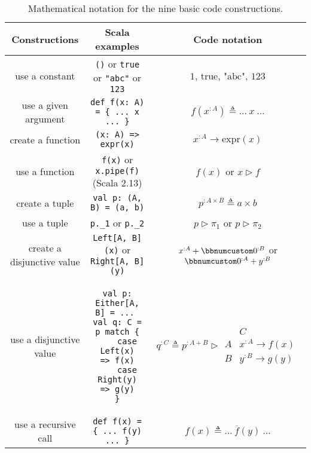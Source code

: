 \begin{table}
\begin{centering}
\begin{tabular}{|c|c|c|}
\hline 
\textbf{\small{}Constructions} & \textbf{\small{}Scala examples} & \textbf{\small{}Code notation}\tabularnewline
\hline 
\hline 
{\small{}use a constant} & {\small{}}\lstinline!()!{\small{} or }\lstinline!true!{\small{}
or }\lstinline!"abc"!{\small{} or }\lstinline!123! & {\small{}$1$, $\text{true}$, $\text{"abc"}$, $123$}\tabularnewline
\hline 
{\small{}use a given argument} & {\small{}}\lstinline!def f(x: A) = { ... x ... }! & {\small{}$f(x^{:A})\triangleq...~x~...$}\tabularnewline
\hline 
{\small{}create a function} & {\small{}}\lstinline!(x: A) => expr(x)! & {\small{}$x^{:A}\rightarrow\text{expr}\left(x\right)$}\tabularnewline
\hline 
{\small{}use a function} & {\small{}}\lstinline!f(x)!{\small{} or }\lstinline!x.pipe(f)!{\small{}
(Scala 2.13)} & {\small{}$f(x)$ or $x\triangleright f$}\tabularnewline
\hline 
{\small{}create a tuple} & {\small{}}\lstinline!val p: (A, B) = (a, b)! & {\small{}$p^{:A\times B}\triangleq a\times b$}\tabularnewline
\hline 
{\small{}use a tuple} & {\small{}}\lstinline!p._1!{\small{} or }\lstinline!p._2! & {\small{}$p\triangleright\pi_{1}$ or $p\triangleright\pi_{2}$}\tabularnewline
\hline 
{\small{}create a disjunctive value} & {\small{}}\lstinline!Left[A, B](x)!{\small{} or }\lstinline!Right[A, B](y)! & {\small{}$x^{:A}+\bbnum 0^{:B}$ or $\bbnum 0^{:A}+y^{:B}$}\tabularnewline
\hline 
{\small{}use a disjunctive value} & {\small{}\hspace*{-0.013\linewidth}}%
\begin{minipage}[c][1\totalheight][b]{0.33\columnwidth}%
{\small{}\vspace{0.14\baselineskip}
}
\begin{lstlisting}
val p: Either[A, B] = ... 
val q: C = p match {
    case Left(x)   => f(x)
    case Right(y)  => g(y)
}
\end{lstlisting}
{\small{}\vspace{-0.1\baselineskip}
}%
\end{minipage}{\small{} \hspace*{-0.009\linewidth}} & {\small{}$q^{:C}\triangleq p^{:A+B}\triangleright\begin{array}{|c||c|}
 & C\\
\hline A & x^{:A}\rightarrow f(x)\\
B & y^{:B}\rightarrow g(y)
\end{array}$}\tabularnewline
\hline 
{\small{}use a recursive call} & {\small{}}\lstinline!def f(x) = { ... f(y) ... }! & {\small{}$f(x)\triangleq...~\overline{f}(y)~...$}\tabularnewline
\hline 
\end{tabular}
\par\end{centering}
\caption{Mathematical notation for the nine basic code constructions.\label{tab:Mathematical-notation-for-basic-code-constructions}}
\end{table}


